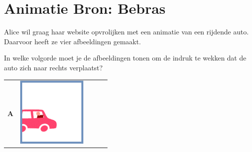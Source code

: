 \documentclass[12pt]{article}
\begin{document}
	\begin{minipage}{\textwidth}
		\section{Animatie \hfill\small Bron: Bebras}
		Alice wil graag haar website opvrolijken met een animatie van een rijdende auto. Daarvoor heeft ze vier afbeeldingen gemaakt.
		
		In welke volgorde moet je de afbeeldingen tonen om de indruk te wekken dat de auto zich naar rechts verplaatst? 
		
		\begin{table}[H]
			\begin{tabulary}{\linewidth}{|C|CCCC|}
				\hline 
				\textbf{A} & 
				\vspace{0.01cm}\includegraphics[width=\linewidth]{option1} &

\end{tabulary}
\end{table}
\end{minipage}
\end{document}
